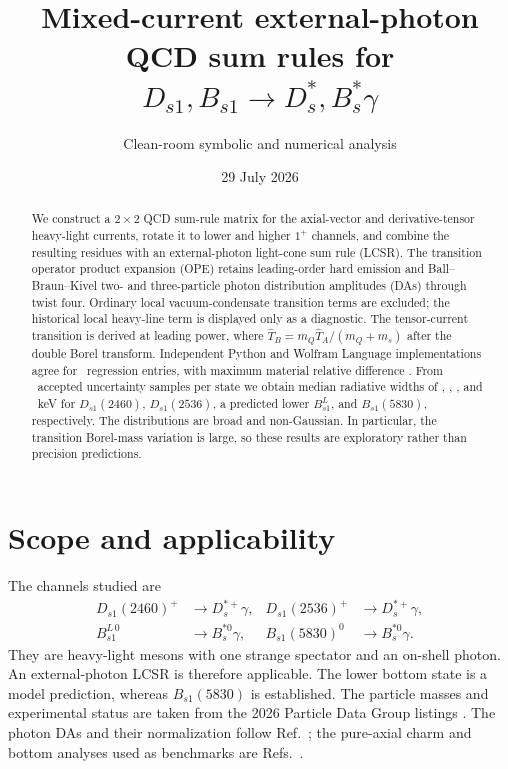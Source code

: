 \documentclass[11pt,a4paper]{article}
\title{\textbf{Mixed-current external-photon QCD sum rules for}\\
$D_{s1},B_{s1}\to D_s^\ast,B_s^\ast\gamma$}
\author{Clean-room symbolic and numerical analysis}
\date{29 July 2026}
\newcommand{\Twide}{\widehat T}
\begin{document}
\maketitle

\begin{abstract}
We construct a $2\times2$ QCD sum-rule matrix for the axial-vector and
derivative-tensor heavy-light currents, rotate it to lower and higher
$1^+$ channels, and combine the resulting residues with an
external-photon light-cone sum rule (LCSR).  The transition operator product
expansion (OPE) retains leading-order hard emission and Ball--Braun--Kivel
two- and three-particle photon distribution amplitudes (DAs) through twist
four.  Ordinary local vacuum-condensate transition terms are excluded; the
historical local heavy-line term is displayed only as a diagnostic.  The
tensor-current transition is derived at leading power, where
$\Twide_B=m_Q\Twide_A/(m_Q+m_s)$ after the double Borel transform.  Independent
Python and Wolfram Language implementations agree for \RegressionPass\
regression entries, with maximum material relative difference
\RegressionMaxRel.  From \NMonteCarlo\ accepted uncertainty samples per state
we obtain median radiative widths of \DsLowWidth, \DsHighWidth, \BsLowWidth,
and \BsHighWidth\ keV for $D_{s1}(2460)$, $D_{s1}(2536)$, a predicted lower
$B_{s1}^{L}$, and $B_{s1}(5830)$, respectively.  The distributions are broad
and non-Gaussian.  In particular, the transition Borel-mass variation is
large, so these results are exploratory rather than precision predictions.
\end{abstract}

\section{Scope and applicability}

The channels studied are
\begin{align}
D_{s1}(2460)^+&\to D_s^{\ast+}\gamma,&
D_{s1}(2536)^+&\to D_s^{\ast+}\gamma,\nonumber\\
B_{s1}^{L\,0}&\to B_s^{\ast0}\gamma,&
B_{s1}(5830)^0&\to B_s^{\ast0}\gamma .
\end{align}
They are heavy-light mesons with one strange spectator and an on-shell
photon.  An external-photon LCSR is therefore applicable.  The lower bottom
state is a model prediction, whereas $B_{s1}(5830)$ is established.  The
particle masses and experimental status are taken from the 2026 Particle
Data Group listings \cite{PDG2026}.  The photon DAs and their normalization
follow Ref.~\cite{BBK2003}; the pure-axial charm and bottom analyses used as
benchmarks are Refs.~\cite{Colangelo2005,Wang2008}.
\end{document}
